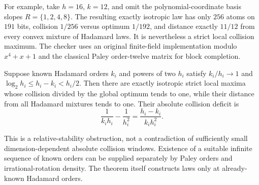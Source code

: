 For example, take $h=16$, $k=12$, and omit the polynomial-coordinate
basis slopes $R=\{1,2,4,8\}$. The resulting exactly isotropic law has
only $256$ atoms on $191$ bits, collision $1/256$ versus optimum $1/192$,
and distance exactly $11/12$ from every convex mixture of Hadamard laws.
It is nevertheless a strict local collision maximum. The checker uses
an original finite-field implementation modulo $x^4+x+1$ and the
classical Paley order-twelve matrix for block completion.

\begin{corollary}
\label{cor:design-relative-regime}
Suppose known Hadamard orders $k_i$ and powers of two $h_i$ satisfy
$k_i/h_i\to1$ and
$\log_2h_i\le h_i-k_i<h_i/2$.
Then there are exactly isotropic strict local maxima whose collision
divided by the global optimum tends to one, while their distance from
all Hadamard mixtures tends to one.
Their absolute collision deficit is
\[
 \frac1{k_i h_i}-\frac1{h_i^2}
 =\frac{h_i-k_i}{k_i h_i^2}.
\]
\end{corollary}
This is a relative-stability obstruction, not a contradiction of
sufficiently small dimension-dependent absolute collision windows.
Existence of a suitable infinite sequence of known orders can be
supplied separately by Paley orders and irrational-rotation density.
The theorem itself constructs laws only at already-known Hadamard orders.
